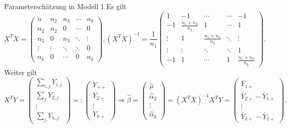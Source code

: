 \begin{karte}{Parameterschätzung in Modell 1}
Es gilt 
\[ X^T X = \begin{pmatrix}
    n & n_2 & n_3 & \cdots & n_k \\
    n_2 & n_2 & 0 & \cdots & 0 \\
    n_3 & 0 & n_3 & \ddots & \vdots \\
    \vdots & \vdots & \ddots & \ddots & 0 \\
    n_k & 0 & \cdots & 0 & n_k
\end{pmatrix}, (X^T X)^{-1} = \frac{1}{n_1} \begin{pmatrix}
    1 & -1 & \cdots & \cdots & -1 \\
    -1 & \frac{n_1 + n_2}{n_2} & 1 & \cdots & 1 \\
    \vdots & 1 & \frac{n_1 + n_3}{n_3} & \ddots & \vdots \\
    \vdots & \vdots & \ddots & \ddots & 1 \\
    -1 & 1 & \cdots & 1 & \frac{n_1 + n_k}{n_k}
\end{pmatrix}. \]
Weiter gilt 
\[ X^T Y = \begin{pmatrix}
    \sum_{i,j} Y_{i,j} \\
    \sum_j Y_{2,j} \\
    \vdots \\
    \sum_j Y_{k,j}
\end{pmatrix} =: \begin{pmatrix}
    Y_{++} \\
    Y_{2+} \\
    \vdots \\
    Y_{k+}
\end{pmatrix} \Rightarrow \hat{\beta} = 
\begin{pmatrix}
    \hat{\mu} \\
    \hat{\alpha}_2 \\
    \vdots \\
    \hat{\alpha}_k
\end{pmatrix} = (X^T X)^{-1} X^T Y = \begin{pmatrix}
    \bar{Y}_{1+} \\
    \bar{Y}_{2+} - \bar{Y}_{1+} \\
    \vdots \\
    \bar{Y}_{k+} - \bar{Y}_{1+}
\end{pmatrix}. \]
\end{karte}

